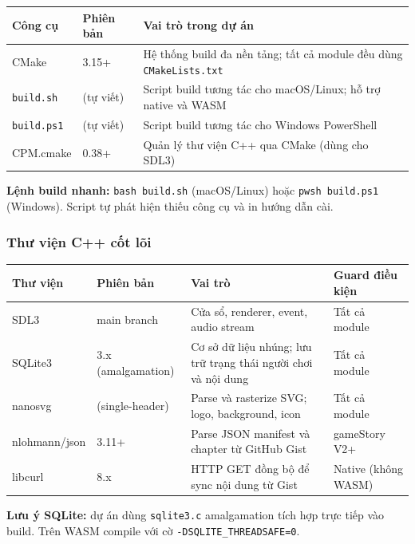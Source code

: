 \documentclass[12pt,a4paper]{article}
\begin{document}
\begin{tabularx}{\linewidth}{|l|l|X|}
\hline
\rowcolor{gray!20}
\textbf{Công cụ} & \textbf{Phiên bản} & \textbf{Vai trò trong dự án} \\
\hline
CMake & 3.15+ & Hệ thống build đa nền tảng; tất cả module đều dùng \texttt{CMakeLists.txt} \\
\hline
\texttt{build.sh} & (tự viết) & Script build tương tác cho macOS/Linux; hỗ trợ native và WASM \\
\hline
\texttt{build.ps1} & (tự viết) & Script build tương tác cho Windows PowerShell \\
\hline
CPM.cmake & 0.38+ & Quản lý thư viện C++ qua CMake (dùng cho SDL3) \\
\hline
\end{tabularx}

\vspace{4pt}
\noindent\textbf{Lệnh build nhanh:} \texttt{bash build.sh} (macOS/Linux) hoặc
\texttt{pwsh build.ps1} (Windows). Script tự phát hiện thiếu công cụ và in hướng dẫn cài.

\subsubsection{Thư viện C++ cốt lõi}

\begin{tabularx}{\linewidth}{|l|l|X|l|}
\hline
\rowcolor{gray!20}
\textbf{Thư viện} & \textbf{Phiên bản} & \textbf{Vai trò} & \textbf{Guard điều kiện} \\
\hline
SDL3 & main branch & Cửa sổ, renderer, event, audio stream & Tất cả module \\
\hline
SQLite3 & 3.x (amalgamation) & Cơ sở dữ liệu nhúng; lưu trữ trạng thái người chơi và nội dung & Tất cả module \\
\hline
nanosvg & (single-header) & Parse và rasterize SVG; logo, background, icon & Tất cả module \\
\hline
nlohmann/json & 3.11+ & Parse JSON manifest và chapter từ GitHub Gist & gameStory V2+ \\
\hline
libcurl & 8.x & HTTP GET đồng bộ để sync nội dung từ Gist & Native (không WASM) \\
\hline
\end{tabularx}

\vspace{4pt}
\noindent\textbf{Lưu ý SQLite:} dự án dùng \texttt{sqlite3.c} amalgamation tích hợp
trực tiếp vào build. Trên WASM compile với cờ \texttt{-DSQLITE\_THREADSAFE=0}.
\end{document}
